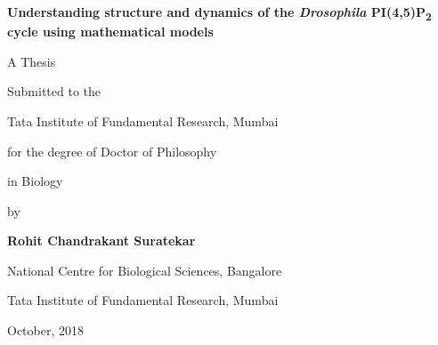 \begin{titlepage}
	\centering
	\vfill
	{\huge\bfseries Understanding structure and dynamics of the \textit{Drosophila} PI(4,5)P\textsubscript{2} cycle using mathematical models \par}
	\vspace{2cm}
	{\Large A Thesis\par}
	\vfill
	Submitted to the\par
	{\Large Tata Institute of Fundamental Research, Mumbai\par
	for the degree of Doctor of Philosophy\par in Biology \par}
	\vspace{1cm}
	by\par
	\vspace{0.5cm}
	{\Large \bfseries Rohit Chandrakant Suratekar\par}
	\vfill
	
	{\large National Centre for Biological Sciences, Bangalore\par
		Tata Institute of Fundamental Research, Mumbai\par}
	{October, 2018}
\end{titlepage}
